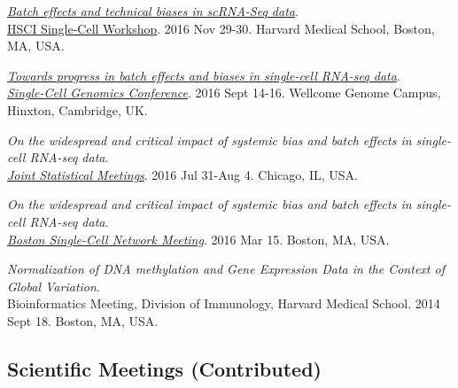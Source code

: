 \documentclass[10pt]{article}
\begin{document}
\item 
{\it \href{https://github.com/hms-dbmi/scw/tree/master/scw2016/tutorials/batcheffects}{Batch effects and technical biases in scRNA-Seq data}}. \\ 
\href{http://hsci.harvard.edu/event/save-date-single-cell-analysis-workshop}{HSCI Single-Cell Workshop}. 2016 Nov 29-30. Harvard Medical School, Boston, MA, USA.
\item
{\it \href{https://speakerdeck.com/stephaniehicks/towards-progress-in-batch-effects-and-biases-in-single-cell-rna-seq-data}{Towards progress in batch effects and biases in single-cell RNA-seq data}}. \\
\href{https://coursesandconferences.wellcomegenomecampus.org/events/item.aspx?e=596}{{\it Single-Cell Genomics Conference}}. 2016 Sept 14-16. Wellcome Genome Campus, Hinxton, Cambridge, UK.
\item
{\it On the widespread and critical impact of systemic bias and batch effects in single-cell RNA-seq data}. \\
\href{https://www.amstat.org/meetings/jsm/2016/onlineprogram/MainSearchResults.cfm}{{\it Joint Statistical Meetings}}. 2016 Jul 31-Aug 4. Chicago, IL, USA.
\item
{\it On the widespread and critical impact of systemic bias and batch effects in single-cell RNA-seq data}. \\
\href{http://hsci.harvard.edu/event/widespread-and-critical-impact-systemic-bias-and-batch-effects-single-cell-rna-seq-data?delta=0}{{\it Boston Single-Cell Network Meeting}}. 2016 Mar 15. Boston, MA, USA.
\item 
{\it Normalization of DNA methylation and Gene Expression Data in the Context of Global Variation}. \\
Bioinformatics Meeting, Division of Immunology, Harvard Medical School. 2014 Sept 18. Boston, MA, USA.


\subsection*{Scientific Meetings (Contributed)}
\end{document}
